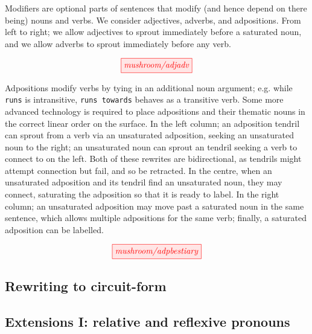 Modifiers are optional parts of sentences that modify (and hence depend on there being) nouns and verbs. We consider adjectives, adverbs, and adpositions. From left to right; we allow adjectives to sprout immediately before a saturated noun, and we allow adverbs to sprout immediately before any verb.

\[
\tikzfig{mushroom/adjadv}
\]

Adpositions modify verbs by tying in an additional noun argument; e.g. while \texttt{runs} is intransitive, \texttt{runs towards} behaves as a transitive verb. Some more advanced technology is required to place adpositions and their thematic nouns in the correct linear order on the surface. In the left column; an adposition tendril can sprout from a verb via an unsaturated adposition, seeking an unsaturated noun to the right; an unsaturated noun can sprout an tendril seeking a verb to connect to on the left. Both of these rewrites are bidirectional, as tendrils might attempt connection but fail, and so be retracted. In the centre, when an unsaturated adposition and its tendril find an unsaturated noun, they may connect, saturating the adposition so that it is ready to label. In the right column; an unsaturated adposition may move past a saturated noun in the same sentence, which allows multiple adpositions for the same verb; finally, a saturated adposition can be labelled.

\[
\tikzfig{mushroom/adpbestiary}
\]

\subsection{Rewriting to circuit-form}



\begin{example}

\end{example}

\subsection{Extensions I: relative and reflexive pronouns}


\begin{example}

\end{example}

